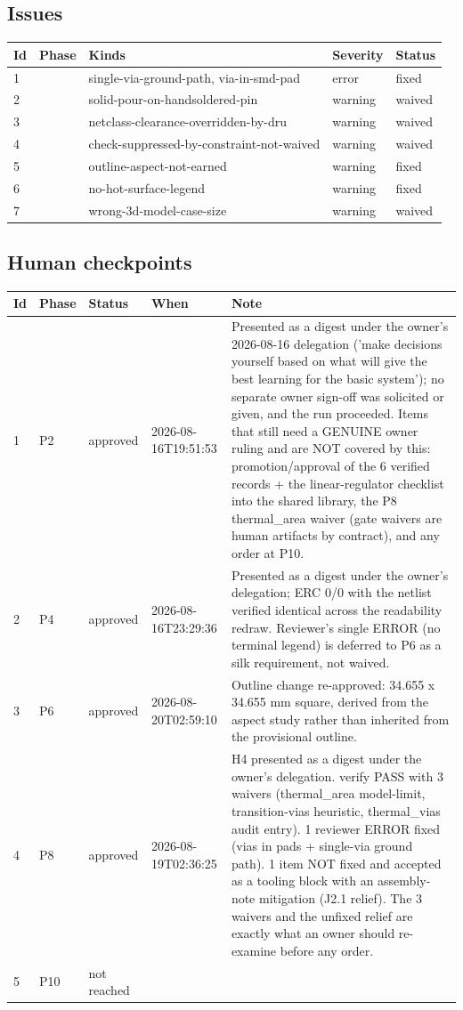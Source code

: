 \documentclass[11pt,a4paper]{article}
\begin{document}
\subsection*{Issues}
{\small
\begin{longtable}{llp{5cm}ll}
\toprule
\textbf{Id} & \textbf{Phase} & \textbf{Kinds} & \textbf{Severity} & \textbf{Status} \\
\midrule
\endhead
1 &  & single-via-ground-path, via-in-smd-pad & error & fixed \\
2 &  & solid-pour-on-handsoldered-pin & warning & waived \\
3 &  & netclass-clearance-overridden-by-dru & warning & waived \\
4 &  & check-suppressed-by-constraint-not-waived & warning & waived \\
5 &  & outline-aspect-not-earned & warning & fixed \\
6 &  & no-hot-surface-legend & warning & fixed \\
7 &  & wrong-3d-model-case-size & warning & waived \\
\bottomrule
\end{longtable}
}
\subsection*{Human checkpoints}
{\small
\begin{longtable}{lllp{2.6cm}p{6.4cm}}
\toprule
\textbf{Id} & \textbf{Phase} & \textbf{Status} & \textbf{When} & \textbf{Note} \\
\midrule
\endhead
1 & P2 & approved & 2026-08-16T19:51:53 & Presented as a digest under the owner's 2026-08-16 delegation ('make decisions yourself based on what will give the best learning for the basic system'); no separate owner sign-off was solicited or given, and the run proceeded. Items that still need a GENUINE owner ruling and are NOT covered by this: promotion/approval of the 6 verified records + the linear-regulator checklist into the shared library, the P8 thermal\_area waiver (gate waivers are human artifacts by contract), and any order at P10. \\
2 & P4 & approved & 2026-08-16T23:29:36 & Presented as a digest under the owner's delegation; ERC 0/0 with the netlist verified identical across the readability redraw. Reviewer's single ERROR (no terminal legend) is deferred to P6 as a silk requirement, not waived. \\
3 & P6 & approved & 2026-08-20T02:59:10 & Outline change re-approved: 34.655 x 34.655 mm square, derived from the aspect study rather than inherited from the provisional outline. \\
4 & P8 & approved & 2026-08-19T02:36:25 & H4 presented as a digest under the owner's delegation. verify PASS with 3 waivers (thermal\_area model-limit, transition-vias heuristic, thermal\_vias audit entry). 1 reviewer ERROR fixed (vias in pads + single-via ground path). 1 item NOT fixed and accepted as a tooling block with an assembly-note mitigation (J2.1 relief). The 3 waivers and the unfixed relief are exactly what an owner should re-examine before any order. \\
5 & P10 & not reached &  &  \\
\bottomrule
\end{longtable}
}
\end{document}
